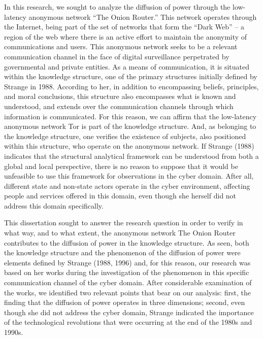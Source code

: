 In this research, we sought to analyze the diffusion of power through the low-latency anonymous network ``The Onion Router.'' This network operates through the Internet, being part of the set of networks that form the ``Dark Web'' -- a region of the web where there is an active effort to maintain the anonymity of communications and users. This anonymous network seeks to be a relevant communication channel in the face of digital surveillance perpetrated by governmental and private entities. As a means of communication, it is situated within the knowledge structure, one of the primary structures initially defined by Strange in 1988. According to her, in addition to encompassing beliefs, principles, and moral conclusions, this structure also encompasses what is known and understood, and extends over the communication channels through which information is communicated. For this reason, we can affirm that the low-latency anonymous network Tor is part of the knowledge structure. And, as belonging to the knowledge structure, one verifies the existence of subjects, also positioned within this structure, who operate on the anonymous network. If Strange (1988) indicates that the structural analytical framework can be understood from both a global and local perspective, there is no reason to suppose that it would be unfeasible to use this framework for observations in the cyber domain. After all, different state and non-state actors operate in the cyber environment, affecting people and services offered in this domain, even though she herself did not address this domain specifically.

This dissertation sought to answer the research question in order to verify in what way, and to what extent, the anonymous network The Onion Router contributes to the diffusion of power in the knowledge structure. As seen, both the knowledge structure and the phenomenon of the diffusion of power were elements defined by Strange (1988, 1996) and, for this reason, our research was based on her works during the investigation of the phenomenon in this specific communication channel of the cyber domain. After considerable examination of the works, we identified two relevant points that bear on our analysis: first, the finding that the diffusion of power operates in three dimensions; second, even though she did not address the cyber domain, Strange indicated the importance of the technological revolutions that were occurring at the end of the 1980s and 1990s.

